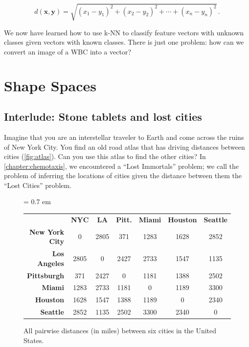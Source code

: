 $$d(\mathbf{x}, \mathbf{y}) = \sqrt{(x_1 - y_1)^2 + (x_2 - y_2)^2 + \cdots + (x_n-y_n)^2}\,.$$

We now have learned how to use k-NN to classify feature vectors with unknown classes given vectors with known classes. There is just one problem: how can we convert an image of a WBC into a vector?\\

\FloatBarrier
{}

\section{Shape Spaces}
\label{sec:shape_spaces}

\subsection{Interlude: Stone tablets and lost cities}

Imagine that you are an interstellar traveler to Earth and come across the ruins of New York City. You find an old road atlas that has driving distances between cities (\autoref{fig:atlas}). Can you use this atlas to find the other cities? In \autoref{chapter:chemotaxis}, we encountered a ``Lost Immortals'' problem; we call the problem of inferring the locations of cities given the distance between them the ``Lost Cities'' problem.\\

\begin{figure}[h]
\centering
\tabcolsep = 0.7 em
\mySfFamily
\small
{}
\begin{tabular}{r c c c c c c}
\rowcolor{gray!50}
& \textbf{NYC} & \textbf{LA} & \textbf{Pitt.} & \textbf{Miami} & \textbf{Houston} & \textbf{Seattle} \\
\textbf{New York City} & 0 & 2805 & 371 & 1283 & 1628 & 2852 \\
\textbf{Los Angeles} & 2805 & 0 & 2427 & 2733 & 1547 & 1135 \\
\textbf{Pittsburgh} & 371 & 2427 & 0 & 1181 & 1388 & 2502 \\
\textbf{Miami} & 1283 & 2733 & 1181 & 0 & 1189 & 3300 \\
\textbf{Houston} & 1628 & 1547 & 1388 & 1189 & 0 & 2340 \\
\textbf{Seattle} & 2852 & 1135 & 2502 & 3300 & 2340 & 0 \\
\end{tabular}
\caption{All pairwise distances (in miles) between six cities in the United States.}
\label{fig:atlas}
\end{figure}

